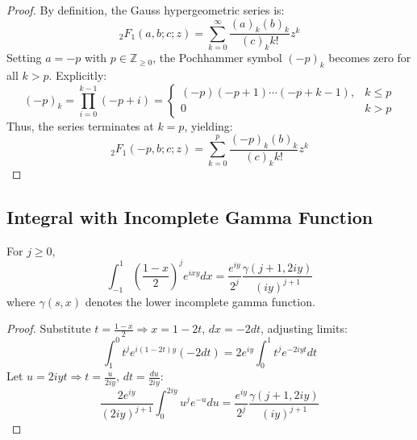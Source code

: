 \documentclass{article}
\begin{document}
\begin{proof}
  By definition, the Gauss hypergeometric series is:
  \begin{equation*}
    {}_2 F_1 (a, b ; c ; z) = \sum_{k = 0}^{\infty} \frac{(a)_k (b)_k}{(c)_k k!}
    z^k
  \end{equation*}
  Setting $a = - p$ with $p \in \mathbb{Z}_{\geq 0}$, the Pochhammer symbol
  $(- p)_k$ becomes zero for all $k > p$. Explicitly:
  \begin{equation*}
    (- p)_k = \prod_{i = 0}^{k - 1} (- p + i) = \begin{cases}
      (- p) (- p + 1) \cdots (- p + k - 1), & k \leq p \\
      0 & k > p
    \end{cases}
  \end{equation*}
  Thus, the series terminates at $k = p$, yielding:
  \begin{equation*}
    {}_2 F_1 (- p, b ; c ; z) = \sum_{k = 0}^p \frac{(- p)_k (b)_k}{(c)_k k!}
    z^k
  \end{equation*}
\end{proof}

\subsection{Integral with Incomplete Gamma Function}
\begin{lemma}
  \label{lem:IntegralGamma}
  For $j \geq 0$,
  \begin{equation*}
    \int_{- 1}^1 \left( \frac{1 - x}{2} \right)^j e^{ixy} dx =
    \frac{e^{iy}}{2^j}  \frac{\gamma (j + 1, 2 iy)}{(iy)^{j + 1}}
  \end{equation*}
  where $\gamma (s, x)$ denotes the lower incomplete gamma function.
\end{lemma}

\begin{proof}
  Substitute $t = \frac{1 - x}{2} \Longrightarrow x = 1 - 2 t$, $dx = - 2 dt$,
  adjusting limits:
  \begin{equation*}
    \int_1^0 t^j e^{i (1 - 2 t) y}  (- 2 dt) = 2 e^{iy}  \int_0^1 t^j e^{- 2
    iyt} dt
  \end{equation*}
  Let $u = 2 iyt \Longrightarrow t = \frac{u}{2 iy}$, $dt = \frac{d u}{2 i
  y}$:
  \begin{equation*}
     \frac{2 e^{iy}}{(2 iy)^{j + 1}}  \int_0^{2 iy} u^j e^{- u} du =
     \frac{e^{iy}}{2^j}  \frac{\gamma (j + 1, 2 iy)}{(iy)^{j + 1}} 
  \end{equation*}
\end{proof}
\end{document}
